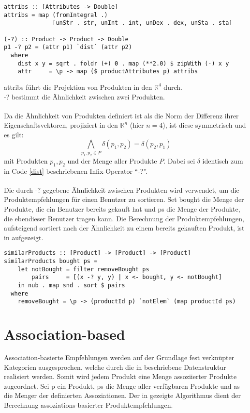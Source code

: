 \begin{lstlisting}[label=code:dist,caption={Algorithmus zur Berechnung der Ähnlichkeit von Produkten}]
attribs :: [Attributes -> Double]
attribs = map (fromIntegral .)
              [unStr . str, unInt . int, unDex . dex, unSta . sta]

(-?) :: Product -> Product -> Double
p1 -? p2 = (attr p1) `dist` (attr p2)
  where
    dist x y = sqrt . foldr (+) 0 . map (**2.0) $ zipWith (-) x y
    attr     = \p -> map ($ productAttributes p) attribs
\end{lstlisting}
\textsf{attribs} führt die Projektion von Produkten in den $\mathbb{R}^4$ durch. \\
\textsf{-?} bestimmt die Ähnlichkeit zwischen zwei Produkten.\\
\\
Da die Ähnlichkeit von Produkten definiert ist als die Norm der Differenz ihrer Eigenschaftsvektoren, projiziert in den $\mathbb{R}^n$ (hier $n = 4$), ist diese symmetrisch und es gilt:
\begin{equation}
  \bigwedge_{p_1, p_2 \in P} \delta\left(p_1, p_2\right) = \delta\left(p_2, p_1\right)
\end{equation}
mit Produkten $p_1, p_2$ und der Menge aller Produkte $P$. Dabei sei $\delta$ identisch zum in Code \ref{dist} beschriebenen Infix-Operator \enquote{\textsf{-?}}.\\
\\
Die durch \textsf{-?} gegebene Ähnlichkeit zwischen Produkten wird verwendet, um die Produktempfehlungen für einen Benutzer zu sortieren. Set \textsf{bought} die Menge der Produkte, die ein Benutzer bereits gekauft hat und \textsf{ps} die Menge der Produkte, die ebendieser Benutzer tragen kann. Die Berechnung der Produktempfehlungen, aufsteigend sortiert nach der Ähnlichkeit zu einem bereits gekauften Produkt, ist in  aufgezeigt.

\begin{lstlisting}[label=code:fb-suggestions,caption={Algorithmus zur Generierung feature-basierter Produktempfehlungen}]
similarProducts :: [Product] -> [Product] -> [Product]
similarProducts bought ps = 
    let notBought = filter removeBought ps
        pairs     = [(x -? y, y) | x <- bought, y <- notBought]
    in nub . map snd . sort $ pairs
  where
    removeBought = \p -> (productId p) `notElem` (map productId ps)
\end{lstlisting}


\section{Association-based}
Association-basierte Empfehlungen werden auf der Grundlage fest verknüpter Kategorien ausgesprochen, welche durch die in  beschriebene Datenstruktur realisiert werden. Somit wird jedem Produkt eine Menge assoziierter Produkte zugeordnet. Sei \textsf{p} ein Produkt, \textsf{ps} die Menge aller verfügbaren Produkte und \textsf{as} die Menger der definierten Assoziationen. Der in  gezeigte Algorithmus dient der Berechnung assoziations-basierter Produktempfehlungen.

